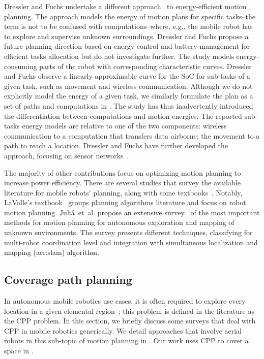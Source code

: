 Dressler and Fuchs undertake a different approach~\citep{dressler2005energy} to energy-efficient motion planning. The approach models the energy of motion plans for specific tasks--the term is not to be confused with computations--where, e.g., the mobile robot has to explore and supervise unknown surroundings. Dressler and Fuchs propose a future planning direction based on energy control and battery management for efficient tasks allocation but do not investigate further. The study models energy-consuming parts of the robot with corresponding characteristic curves. Dressler and Fuchs observe a linearly approximable curve for the SoC for sub-tasks of a given task, such as movement and wireless communication. Although we do not explicitly model the energy of a given task, we similarly formulate the plan as a set of paths and computations in . The study has thus inadvertently introduced the differentiation between computations and motion energies. The reported sub-tasks energy models are relative to one of the two components: wireless communication to a computation that transfers data airborne; the movement to a path to reach a location. Dressler and Fuchs have further developed the approach, focusing on sensor networks~\citep{fuchs2006distributed,dressler2006lifetime}.

The majority of other contributions focus on optimizing motion planning to increase power efficiency. There are several studies that survey the available literature for mobile robots' planning, along with some textbooks~\citep{choset2005principles,lavalle2006planning}. Notably, LaValle's textbook~\citep{lavalle2006planning} groups planning algorithms literature and focus on robot motion planning. Juli\'{a}~et~al. propose an extensive survey~\citep{julia2012comparison} of the most important methods for motion planning for autonomous exploration and mapping of unknown environments. The survey presents different techniques, classifying for multi-robot coordination level and integration with simultaneous localization and mapping (\Gls{acr:slam}) algorithm.

\subsection{Coverage path planning}
\label{sec:soa-cov-path-plan}

In autonomous mobile robotics use cases, it is often required to explore every location in a given elemental region~\citep{cao1988region}; this problem is defined in the literature as the CPP problem. In this section, we briefly discuss some surveys that deal with CPP in mobile robotics generically. We detail approaches that involve aerial robots in this sub-topic of motion planning in . Our work uses CPP to cover a space in .


